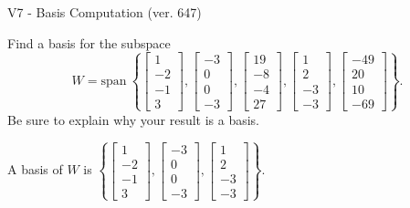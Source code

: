 \begin{exercise}
  \begin{exerciseTitle}V7 - Basis Computation (ver. 647)\end{exerciseTitle}
  \begin{exerciseStatement}
    Find a basis for the subspace 
\[W=\mathrm{span}\ \left\{\left[\begin{array}{r}
1 \\
-2 \\
-1 \\
3
\end{array}\right] , \left[\begin{array}{r}
-3 \\
0 \\
0 \\
-3
\end{array}\right] , \left[\begin{array}{r}
19 \\
-8 \\
-4 \\
27
\end{array}\right] , \left[\begin{array}{r}
1 \\
2 \\
-3 \\
-3
\end{array}\right] , \left[\begin{array}{r}
-49 \\
20 \\
10 \\
-69
\end{array}\right]\right\}.\]
 Be sure to explain why your result is a basis.


  \end{exerciseStatement}
  \begin{exerciseAnswer}
   A basis of \(W\) is  \(\left\{\left[\begin{array}{r}
1 \\
-2 \\
-1 \\
3
\end{array}\right] , \left[\begin{array}{r}
-3 \\
0 \\
0 \\
-3
\end{array}\right] , \left[\begin{array}{r}
1 \\
2 \\
-3 \\
-3
\end{array}\right]\right\}\).
  


  \end{exerciseAnswer}
\end{exercise}